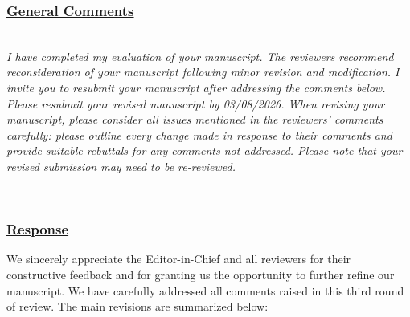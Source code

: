 \documentclass[journal,12pn, onecolumn]{IEEEtran}
\begin{document}
{\color{black}
\subsubsection*{\underline{General Comments}}
\emph{\\
I have completed my evaluation of your manuscript. The reviewers recommend reconsideration of your manuscript following minor revision and modification. I invite you to resubmit your manuscript after addressing the comments below. Please resubmit your revised manuscript by 03/08/2026.
When revising your manuscript, please consider all issues mentioned in the reviewers’ comments carefully: please outline every change made in response to their comments and provide suitable rebuttals for any comments not addressed. Please note that your revised submission may need to be re-reviewed.
}}\\


{\color{black}
\subsubsection*{\textbf{\underline{Response}}}
We sincerely appreciate the Editor-in-Chief and all reviewers for their constructive feedback and for granting us the opportunity to further refine our manuscript. We have carefully addressed all comments raised in this third round of review. The main revisions are summarized below:}\\
\end{document}

